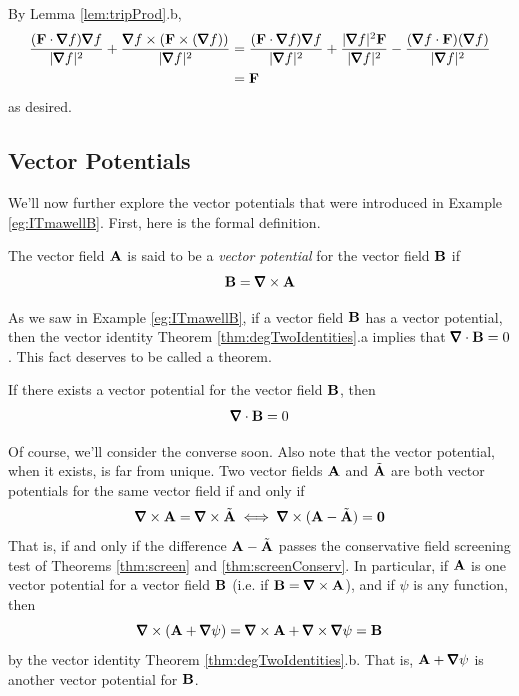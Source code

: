{\begin{eg}
\begin{itemize}
\end{itemize}
By Lemma \ref{lem:tripProd}.b,
\begin{align*}
\frac{(\vF\cdot\vnabla f)\vnabla f}{|\vnabla f|^2}
+\frac{\vnabla f\times(\vF\times(\vnabla f))}{|\vnabla f|^2}
&=\frac{(\vF\cdot\vnabla f)\vnabla f}{|\vnabla f|^2}
+\frac{|\vnabla f|^2\vF}{|\vnabla f|^2}
-\frac{(\vnabla f\cdot\vF)(\vnabla f)}{|\vnabla f|^2}
\\
&=\vF
\end{align*}
as desired.
\end{eg}

}




\subsection{Vector Potentials}\label{sec:vectorPotential}

We'll now further explore the vector potentials that were introduced in Example
\ref{eg:ITmawellB}. First, here is the formal definition.

\begin{defn}\label{def:vectorPotential}
The vector field $\mathbf{A}$ is said to be a \emph{vector potential} 
for the vector field $\mathbf{B}$ if
\begin{equation*}
\vB=\vnabla\times\vA
\end{equation*}
\end{defn}
As we saw in Example \ref{eg:ITmawellB}, if a vector field $\mathbf{B}$
has a vector potential, then the vector identity 
Theorem \ref{thm:degTwoIdentities}.a implies that
$\vnabla\cdot\vB=0$. This fact deserves to be called a theorem.

\begin{theorem}
   \label{thm:screenVector}
If there exists a vector potential for the vector field $\mathbf{B}$, then
\begin{equation*}
\vnabla\cdot\vB=0
\end{equation*}
\end{theorem}

Of course, we'll consider the converse soon.
Also note that the vector potential, when it exists, is far from unique. 
Two vector fields $\mathbf{A}$ and $\tilde{\mathbf{A}}$ are both vector potentials for the 
same vector field if and only if
\begin{equation*}
\vnabla\times\vA=\vnabla\times\tilde\vA
\iff \vnabla\times(\vA-\tilde\vA)=\vZero
\end{equation*}
That is, if and only if the difference $\mathbf{A}-\tilde{\mathbf{A}}$ passes the conservative
field screening test of Theorems \ref{thm:screen} and \ref{thm:screenConserv}.
In particular, if $\mathbf{A}$ is one vector potential for a vector field $\mathbf{B}$ 
(i.e. if $\vB=\vnabla\times\vA$), and if 
$\psi$ is any function, then 
\begin{equation*}
\vnabla\times(\vA+\vnabla\psi) =\vnabla\times\vA + \vnabla\times\vnabla\psi
=\vB
\end{equation*}
by the vector identity Theorem \ref{thm:degTwoIdentities}.b. That is, $\vA+\vnabla\psi$ is another vector potential for $\mathbf{B}$. 

